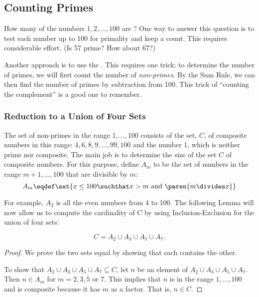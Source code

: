 \begin{editingnotes}


\subsection{Counting Primes}

How many of the numbers $1, 2, \dots, 100$ are ?  One way to
answer this question is to test each number up to 100 for primality and
keep a count.  This requires considerable effort.  (Is 57 prime?  How
about 67?)

Another approach is to use the .  This
requires one trick: to determine the number of primes, we will first count
the number of \emph{non-primes}.  By the Sum Rule, we can then find the
number of primes by subtraction from 100.  This trick of ``counting the
complement'' is a good one to remember.

\subsubsection{Reduction to a Union of Four Sets}

The set of non-primes in the range $1, \dots, 100$ consists of the set,
$C$, of composite numbers in this range: $4, 6, 8, 9, \dots, 99, 100$ and
the number 1, which is neither prime nor composite.  The main job is to
determine the size of the set $C$ of composite numbers.  For this purpose,
define $A_m$ to be the set of numbers in the range $m+1, \dots, 100$ that
are divisible by $m$:
\[
A_m \eqdef \set{x \leq 100 \suchthat x > m \text{ and } \paren{m \divides x}}
\]

For example, $A_2$ is all the even numbers from 4 to 100.  The following
Lemma will now allow us to compute the cardinality of $C$ by using
Inclusion-Exclusion for the union of four sets:

\begin{lemma}
\[
C = A_2 \cup A_3 \cup A_5 \cup A_7.
\]
\end{lemma}

\begin{proof}
We prove the two sets equal by showing that each contains the other.

To show that $A_2 \cup A_3 \cup A_5 \cup A_7 \subseteq C$, let $n$ be an
element of $A_2 \cup A_3 \cup A_5 \cup A_7$.  Then $n \in A_m$ for $m = 2,
3, 5$ or $7$.  This implies that $n$ is in the range $1, \dots, 100$ and
is composite because it has $m$ as a factor.  That is, $n \in C$.


\end{proof}
\end{editingnotes}
